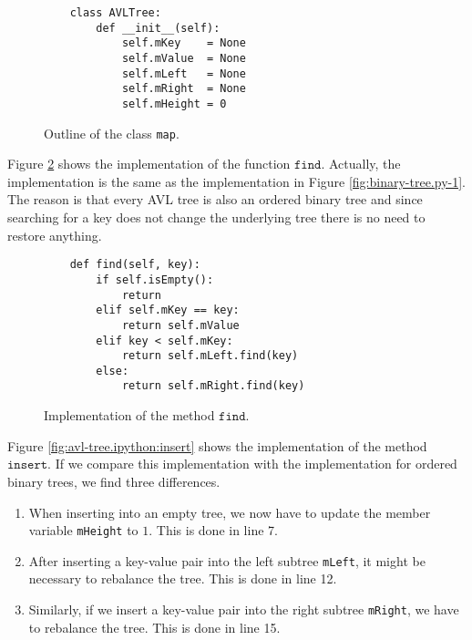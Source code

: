 \begin{figure}[!ht]
  \centering
\begin{verbatim}
    class AVLTree:
        def __init__(self):
            self.mKey    = None
            self.mValue  = None
            self.mLeft   = None
            self.mRight  = None
            self.mHeight = 0 
\end{verbatim}
\vspace*{-0.3cm}
  \caption{Outline of the class \texttt{map}.}
  \label{fig:avl-tree.ipython:init}
\end{figure}


Figure \ref{fig:avl-tree.ipython:find} shows the implementation of the function $\texttt{find}$.
Actually, the implementation is the same as the implementation in Figure
\ref{fig:binary-tree.py-1}.  The reason is that every AVL tree is also an ordered binary tree and
since searching for a key does not change the underlying tree there is no need to restore anything.

\begin{figure}[!ht]
\centering
\begin{verbatim}
    def find(self, key):
        if self.isEmpty():
            return
        elif self.mKey == key:
            return self.mValue
        elif key < self.mKey:
            return self.mLeft.find(key)
        else:
            return self.mRight.find(key)
\end{verbatim}
\vspace*{-0.3cm}
\caption{Implementation of the method $\texttt{find}$.}
\label{fig:avl-tree.ipython:find}
\end{figure}


Figure \ref{fig:avl-tree.ipython:insert} shows the implementation of the method $\texttt{insert}$.
If we compare this implementation with the implementation for ordered binary trees, we find three
differences.
\begin{enumerate}
\item When inserting into an empty tree, we now have to update the member variable \texttt{mHeight}
      to $1$.  This is done in line 7.
\item After inserting a key-value pair into the left subtree \texttt{mLeft}, it might be necessary to 
      rebalance the tree.  This is done in line 12.
\item Similarly, if we insert a key-value pair into the right subtree \texttt{mRight}, we have to rebalance 
      the tree.  This is done in line 15.
\end{enumerate}

